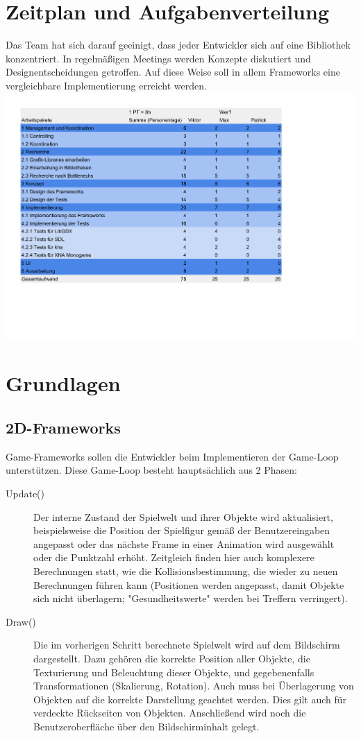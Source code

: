 \chapter{Zeitplan und Aufgabenverteilung}
Das Team hat sich darauf geeinigt, dass jeder Entwickler sich auf eine Bibliothek konzentriert. In regelmäßigen Meetings werden Konzepte diskutiert und Designentscheidungen getroffen. Auf diese Weise soll in allem Frameworks eine vergleichbare Implementierung erreicht werden.\\
\includegraphics[width=1.2\textwidth]{projektplan.pdf}


\chapter{Grundlagen}
\section{2D-Frameworks}
Game-Frameworks sollen die Entwickler beim Implementieren der Game-Loop unterstützen. Diese Game-Loop besteht hauptsächlich aus 2 Phasen:

\begin{description}
\item[Update()] Der interne Zustand der Spielwelt und ihrer Objekte wird aktualisiert, beispielsweise die Position der Spielfigur gemäß der Benutzereingaben angepasst oder das nächste Frame in einer Animation wird ausgewählt oder die Punktzahl erhöht. Zeitgleich finden hier auch komplexere Berechnungen statt, wie die Kollisionsbestimmung, die wieder zu neuen Berechnungen führen kann (Positionen werden angepasst, damit Objekte sich nicht überlagern; "Gesundheitswerte" werden bei Treffern verringert).\\
\item[Draw()] Die im vorherigen Schritt berechnete Spielwelt wird auf dem Bildschirm dargestellt. Dazu gehören die korrekte Position aller Objekte, die Texturierung und Beleuchtung dieser Objekte, und gegebenenfalls Transformationen (Skalierung, Rotation). Auch muss bei Überlagerung von Objekten auf die korrekte Darstellung geachtet werden. Dies gilt auch für verdeckte Rückseiten von Objekten. Anschließend wird noch die Benutzeroberfläche über den Bildschirminhalt gelegt.\\
\end{description}

